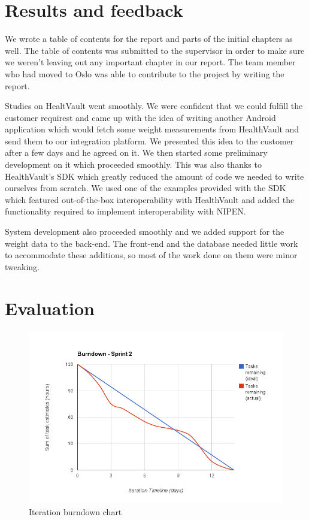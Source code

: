 \section{Results and feedback}

We wrote a table of contents for the report and parts of the initial chapters as well.
The table of contents was submitted to the supervisor in order to make sure we weren't leaving out any important chapter in our report. 
The team member who had moved to Oslo was able to contribute to the project by writing the report.

Studies on HealtVault went smoothly. We were confident that we could fulfill the customer requirest and came up with the idea of writing another Android application which would fetch some weight measurements from HealthVault and send them to our integration platform.
We presented this idea to the customer after a few days and he agreed on it.
We then started some preliminary development on it which proceeded smoothly.
This was also thanks to HealthVault's SDK which greatly reduced the amount of code we needed to write ourselves from scratch. 
We used one of the examples provided with the SDK which featured out-of-the-box interoperability with HealthVault and added the functionality required to implement interoperability with NIPEN.

System development also proceeded smoothly and we added support for the weight data to the back-end.
The front-end and the database needed little work to accommodate these additions, so most of the work done on them were minor tweaking.

\section{Evaluation}

\begin{figure}
\centering
\includegraphics[scale=0.60]{../Figures/burndownSprint2.png}
\caption{Iteration burndown chart}
\label{figure:burndownsprint2}
\end{figure}

